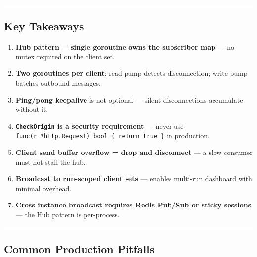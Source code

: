 \documentclass[
]{article}
\providecommand{\tightlist}{%
  \setlength{\itemsep}{0pt}\setlength{\parskip}{0pt}}
\begin{document}
\begin{center}\rule{0.5\linewidth}{0.5pt}\end{center}

\hypertarget{key-takeaways-1}{%
\subsection{Key Takeaways}\label{key-takeaways-1}}

\begin{enumerate}
\def\labelenumi{\arabic{enumi}.}
\tightlist
\item
  \textbf{Hub pattern = single goroutine owns the subscriber map} --- no
  mutex required on the client set.
\item
  \textbf{Two goroutines per client}: read pump detects disconnection;
  write pump batches outbound messages.
\item
  \textbf{Ping/pong keepalive} is not optional --- silent disconnections
  accumulate without it.
\item
  \textbf{\texttt{CheckOrigin} is a security requirement} --- never use
  \texttt{func(r\ *http.Request)\ bool\ \{\ return\ true\ \}} in
  production.
\item
  \textbf{Client send buffer overflow = drop and disconnect} --- a slow
  consumer must not stall the hub.
\item
  \textbf{Broadcast to run-scoped client sets} --- enables multi-run
  dashboard with minimal overhead.
\item
  \textbf{Cross-instance broadcast requires Redis Pub/Sub or sticky
  sessions} --- the Hub pattern is per-process.
\end{enumerate}

\begin{center}\rule{0.5\linewidth}{0.5pt}\end{center}

\hypertarget{common-production-pitfalls-1}{%
\subsection{Common Production
Pitfalls}\label{common-production-pitfalls-1}}
\end{document}
